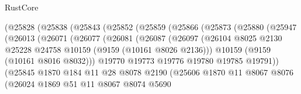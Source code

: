 \begin{lexlean}{RustCore}
\begin{coremodule}
                      (@25828
                        (@25838
                          (@25843
                            (@25852
                              (@25859
                                (@25866
                                  (@25873
                                    (@25880
                                      (@25947
                                        (@26013
                                          (@26071
                                            (@26077
                                              (@26081
                                                (@26087
                                                  (@26097
                                                    (@26104
                                                      @8025
                                                      @2130
                                                      @25228
                                                      @24758
                                                      @10159
                                                      (@9159 (@10161 @8026 @2136)))
                                                    @10159
                                                    (@9159 (@10161 @8016 @8032)))
                                                  @19770
                                                  @19773
                                                  @19776
                                                  @19780
                                                  @19785
                                                  @19791))
                                              (@25845
                                                @1870
                                                @184
                                                @11
                                                @28
                                                @8078
                                                @2190
                                                (@25606
                                                  @1870
                                                  @11
                                                  @8067
                                                  @8076
                                                  (@26024
                                                    @1869
                                                    @51
                                                    @11
                                                    @8067
                                                    @8074
                                                    @5690

\end{coremodule}
\end{lexlean}
